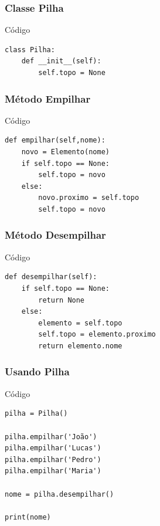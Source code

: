 \documentclass{beamer}
\begin{document}
\begin{frame}[fragile]
\frametitle{Classe Pilha}

\begin{exampleblock}{Código}

\begin{lstlisting}
class Pilha:
    def __init__(self):
        self.topo = None
\end{lstlisting}
\end{exampleblock}
\end{frame}

\begin{frame}[fragile]
\frametitle{Método Empilhar}

\begin{exampleblock}{Código}

\begin{lstlisting}
def empilhar(self,nome):
    novo = Elemento(nome)
    if self.topo == None:
        self.topo = novo
    else:
        novo.proximo = self.topo  
        self.topo = novo
\end{lstlisting}
\end{exampleblock}
\end{frame}

\begin{frame}[fragile]
\frametitle{Método Desempilhar}

\begin{exampleblock}{Código}

\begin{lstlisting}
def desempilhar(self):
    if self.topo == None:
        return None
    else:
        elemento = self.topo
        self.topo = elemento.proximo
        return elemento.nome
\end{lstlisting}
\end{exampleblock}
\end{frame}

\begin{frame}[fragile]
\frametitle{Usando Pilha}

\begin{exampleblock}{Código}

\begin{lstlisting}
pilha = Pilha()

pilha.empilhar('João')
pilha.empilhar('Lucas')
pilha.empilhar('Pedro')
pilha.empilhar('Maria')

nome = pilha.desempilhar()

print(nome)
\end{lstlisting}
\end{exampleblock}
\end{frame}
\end{document}
